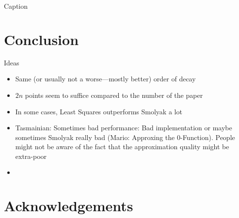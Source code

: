\documentclass[12pt, oneside]{amsart}
\theoremstyle{definition}
\theoremstyle{remark}
\numberwithin{equation}{section}
\begin{document}
\begin{table}[H]
	\centering
	\begin{adjustbox}{width=\linewidth}
		
	\end{adjustbox}
	\caption{Caption}
	\label{tab:dim1_results}
\end{table}


\section{Conclusion}\label{sec:conclusion}

Ideas
\begin{itemize}
	\item Same (or usually not a worse---mostly better) order of decay
	\item $2n$ points seem to suffice compared to the number of the paper
	\item In some cases, Least Squares outperforms Smolyak a lot
	\item Tasmainian: Sometimes bad performance: Bad implementation or maybe 
	sometimes Smolyak really bad (Mario: Approxing the $0$-Function). People 
	might not be aware of the fact that the approximation quality might be 
	extra-poor
	\item 
\end{itemize}


\section*{Acknowledgements}




\newpage

\printbibliography

\bigskip

\noindent
\address{J.E., Johannes Kepler University Linz; 
\texttt{jakob.eggl@jku.at}; \\
	E.M., Johannes Kepler University Linz; 
	\texttt{elias.mindlberger@jku.at}; \\
	M.U., Johannes Kepler University Linz; 
	\texttt{mario.ullrich@jku.at}
}
\end{document}
